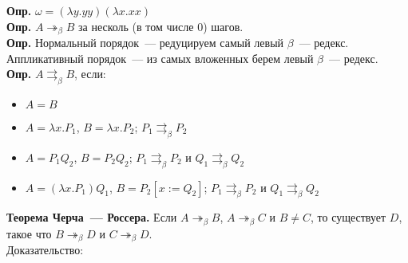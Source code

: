 \documentclass{article}
\begin{document}
	\textbf{Опр.} $\omega = (\lambda y. yy)(\lambda x. xx)$ \\
	\textbf{Опр.} $A \twoheadrightarrow_{\beta} B$ за несколь (в том числе $0$) шагов. \\
	\textbf{Опр.} Нормальный порядок~--- редуцируем самый левый $\beta$~--- редекс. Аппликативный порядок~--- из самых вложенных берем левый $\beta$~--- редекс. \\
	\textbf{Опр.} $A \rightrightarrows_{\beta} B$, если:
	\begin{itemize}
		\item $A = B$
		\item $A = \lambda x. P_1$, $B = \lambda x. P_2$; $P_1 \rightrightarrows_{\beta} P_2$
		\item $A = P_1Q_2$, $B = P_2Q_2$; $P_1 \rightrightarrows_{\beta} P_2$ и $Q_1 \rightrightarrows_{\beta} Q_2$
		\item $A = (\lambda x. P_1)Q_1$, $B = P_2[x := Q_2]$; $P_1 \rightrightarrows_{\beta} P_2$ и $Q_1 \rightrightarrows_{\beta} Q_2$
	\end{itemize}
	\textbf{Теорема Черча~--- Россера.} Если $A \twoheadrightarrow_{\beta} B$, $A \twoheadrightarrow_{\beta} C$ и $B \not= C$, то существует $D$, такое что $B \twoheadrightarrow_{\beta} D$ и $C \twoheadrightarrow_{\beta} D$. \\
	Доказательство:
\end{document}
